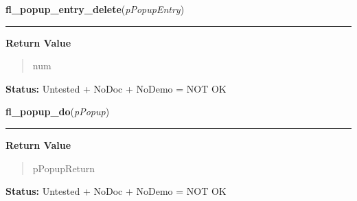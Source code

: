     \vspace{0.5ex}

\hspace{.8\funcindent}\begin{boxedminipage}{\funcwidth}

    \raggedright \textbf{fl\_popup\_entry\_delete}(\textit{pPopupEntry})

    \vspace{-1.5ex}

    \rule{\textwidth}{0.5\fboxrule}
\setlength{\parskip}{2ex}
\setlength{\parskip}{1ex}
      \textbf{Return Value}
    \vspace{-1ex}

      \begin{quote}
      num

      \end{quote}

\textbf{Status:} Untested + NoDoc + NoDemo = NOT OK



    \end{boxedminipage}

    \label{xformslib:flpopup:fl_popup_do}

    \vspace{0.5ex}

\hspace{.8\funcindent}\begin{boxedminipage}{\funcwidth}

    \raggedright \textbf{fl\_popup\_do}(\textit{pPopup})

    \vspace{-1.5ex}

    \rule{\textwidth}{0.5\fboxrule}
\setlength{\parskip}{2ex}
\setlength{\parskip}{1ex}
      \textbf{Return Value}
    \vspace{-1ex}

      \begin{quote}
      pPopupReturn

      \end{quote}

\textbf{Status:} Untested + NoDoc + NoDemo = NOT OK



    \end{boxedminipage}

    \label{xformslib:flpopup:fl_popup_set_position}

